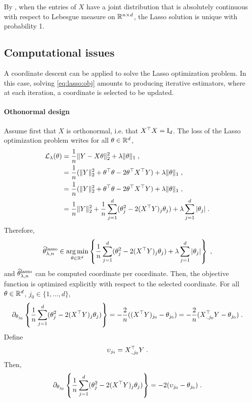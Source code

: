 \begin{remark}
By \cite[Lemma~4]{tibshirani2013lasso},  when the entries of $X$ have a joint distribution that is absolutely continuous with respect to Lebesgue measure on $\mathbb{R}^{n\times d}$,  the Lasso solution is unique with probability 1.
\end{remark}

\subsection{Computational issues}
A coordinate descent can be applied to solve the Lasso optimization problem. In this case, solving \eqref{eq:lasso:obj} amounts to producing iterative estimators, where at each iteration, a coordinate is selected to be updated.  

\paragraph{{\bf Othonormal design} } Assume first that $X$ is orthonormal, i.e. that $X^\top X = \mathrm{I}_d$. The loss of the Lasso optimization problem writes for all $\theta\in\mathbb{R}^d$,
\begin{align*}
\mathcal{L}_\lambda(\theta) &= \frac{1}{n}\|Y-X\theta\|_2^2 + \lambda \|\theta\|_1\;,\\
&= \frac{1}{n}(\|Y\|_2^2+ \theta^\top \theta -2 \theta^\top X^\top Y) + \lambda \|\theta\|_1\;,\\
&= \frac{1}{n}(\|Y\|_2^2+ \theta^\top \theta -2 \theta^\top X^\top Y) + \lambda \|\theta\|_1\;,\\
&= \frac{1}{n}\|Y\|_2^2 + \frac{1}{n}\sum_{j=1}^{d}(\theta_j^2 -2 (X^\top Y)_j\theta_j) + \lambda \sum_{j=1}^d|\theta_j|\;.
\end{align*}
Therefore,
$$
\widehat \param^{\mathrm{lasso}}_{\lambda,n}\in  \argmin_{\param\in\rset^d}  \left\{\frac{1}{n}\sum_{j=1}^{d}(\theta_j^2 -2 (X^\top Y)_j\theta_j) + \lambda \sum_{j=1}^d|\theta_j|\right\}\eqsp,
$$
and $\widehat {\theta}^{\mathrm{lasso}}_{\lambda,n}$ can be computed coordinate per coordinate. Then, the objective function  is optimized explicitly  with respect to the selected coordinate. For all $\theta \in \mathbb{R}^d$,  $j_0\in\{1,\ldots,d\}$,
\[
\partial_{\theta_{j_0}} \left\{\frac{1}{n}\sum_{j=1}^{d}(\theta_j^2 -2 (X^\top Y)_j\theta_j)\right\} = - \frac{2}{n}((X^\top Y)_{j_0} - \theta_{j_0}) = - \frac{2}{n}(X_{.,j_0}^\top Y - \theta_{j_0})\;.
\]
Define
\[
\upsilon_{j_0}=X_{.,j_0}^\top Y\;.
\]
Then,
\[
\partial_{\theta_{j_0}} \left\{\frac{1}{n}\sum_{j=1}^{d}(\theta_j^2 -2 (X^\top Y)_j\theta_j)\right\} = -2( \upsilon_{j_0} - \theta_{j_0})\;.
\]
